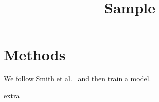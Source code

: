\documentclass{article}
\begin{document}
\title{Sample}
\maketitle

\section{Methods}
We follow Smith et al.~\cite{smith2020} and then train a model.

{extra}



\end{document}
